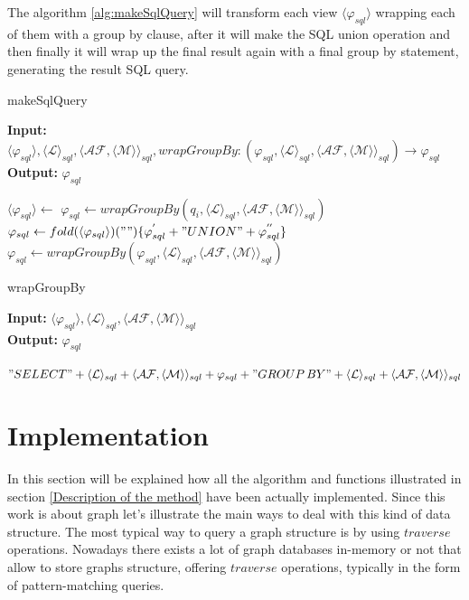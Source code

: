 \documentclass[12pt,a4paper]{report}
\newcommand\sqlQuery{\varphi_{sql}}
\newcommand\level{\mathcal{L}}
\newcommand\measure{\mathcal{M}}
\newcommand\aggregatingFunction{\mathcal{AF}}
\newcommand\set[1]{\langle #1 \rangle}
\begin{document}
The algorithm \ref{alg:makeSqlQuery} will transform each view $\set{\sqlQuery}$ wrapping each of them with a group by clause, after it will make the SQL union operation and then finally it will wrap up the final result again with a final group by statement, generating the result SQL query.
%
\begin{algorithm}[ht]
\caption{makeSqlQuery}\label{alg:makeSqlQuery}
\textbf{Input:} $\set{\sqlQuery},\set{\level}_{sql},\langle \aggregatingFunction,\langle \measure \rangle \rangle_{sql}, wrapGroupBy:(\sqlQuery,\set{\level}_{sql},\langle \aggregatingFunction,\langle \measure \rangle \rangle_{sql}) \rightarrow \sqlQuery$\\
\textbf{Output:} $\sqlQuery$
\begin{algorithmic}[1]
\State $\set{\sqlQuery} \gets $
\ForEach {$q_{i} \in \set{\sqlQuery}$}
    \State $\sqlQuery \gets wrapGroupBy(q_{i},\set{\level}_{sql},\langle \aggregatingFunction,\langle \measure \rangle \rangle_{sql})$
\EndFor
\State $\sqlQuery \gets fold(\set{\sqlQuery})("")\{\sqlQuery^{'} + "UNION" + \sqlQuery^{''}\}$
\State $\sqlQuery \gets wrapGroupBy(\sqlQuery,\set{\level}_{sql},\langle \aggregatingFunction,\langle \measure \rangle \rangle_{sql})$
\end{algorithmic}
\end{algorithm}
%
\begin{algorithm}[ht]
\caption{wrapGroupBy}\label{alg:wrapGroupBy}
\textbf{Input:} $\set{\sqlQuery},\set{\level}_{sql},\langle \aggregatingFunction,\langle \measure \rangle \rangle_{sql}$\\
\textbf{Output:} $\sqlQuery$
\begin{algorithmic}[1]
\State $"SELECT " + \set{\level}_{sql} + \langle \aggregatingFunction,\langle \measure \rangle \rangle_{sql} + \sqlQuery +  "GROUP\,BY " + \set{\level}_{sql} + \langle \aggregatingFunction,\langle \measure \rangle \rangle_{sql}$
\end{algorithmic}
\end{algorithm}



\chapter{Implementation}
In this section will be explained how all the algorithm and functions illustrated in section \ref{Description of the method} have been actually implemented.
%
Since this work is about graph let's illustrate the main ways to deal with this kind of data structure.
%
The most typical way to query a graph structure is by using $traverse$ operations.
%
Nowadays there exists a lot of graph databases in-memory or not that allow to store graphs structure, offering $traverse$ operations, typically in the form of pattern-matching queries.
\end{document}
